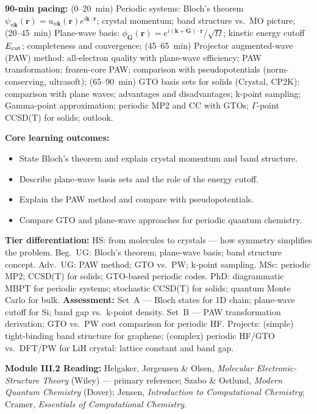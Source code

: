 \documentclass[11pt,a4paper]{article}
\begin{document}
\begin{tcolorbox}[chembox, title={Module~III.2 --- Lecture L16: Glimpse into the Solid State}]
\textbf{90-min pacing:} (0--20~min) Periodic systems: Bloch's theorem $\psi_{n\mathbf{k}}(\mathbf{r})=u_{n\mathbf{k}}(\mathbf{r})e^{i\mathbf{k}\cdot\mathbf{r}}$; crystal momentum; band structure vs.\ MO picture; (20--45~min) Plane-wave basis: $\phi_\mathbf{G}(\mathbf{r})=e^{i(\mathbf{k}+\mathbf{G})\cdot\mathbf{r}}/\sqrt{\Omega}$; kinetic energy cutoff $E_{\rm cut}$; completeness and convergence; (45--65~min) Projector augmented-wave (PAW) method: all-electron quality with plane-wave efficiency; PAW transformation; frozen-core PAW; comparison with pseudopotentials (norm-conserving, ultrasoft); (65--90~min) GTO basis sets for solids (Crystal, CP2K): comparison with plane waves; advantages and disadvantages; k-point sampling; Gamma-point approximation; periodic MP2 and CC with GTOs; $\Gamma$-point CCSD(T) for solids; outlook.

\medskip\textbf{Core learning outcomes:}
\begin{itemize}[leftmargin=1.4em,topsep=2pt,itemsep=1pt]
  \item State Bloch's theorem and explain crystal momentum and band structure.
  \item Describe plane-wave basis sets and the role of the energy cutoff.
  \item Explain the PAW method and compare with pseudopotentials.
  \item Compare GTO and plane-wave approaches for periodic quantum chemistry.
\end{itemize}
\medskip\textbf{Tier differentiation:}
HS: from molecules to crystals --- how symmetry simplifies the problem.
Beg.\ UG: Bloch's theorem; plane-wave basis; band structure concept.
Adv.\ UG: PAW method; GTO vs.\ PW; k-point sampling.
MSc: periodic MP2; CCSD(T) for solids; GTO-based periodic codes.
PhD: diagrammatic MBPT for periodic systems; stochastic CCSD(T) for solids; quantum Monte Carlo for bulk.
\medskip\textbf{Assessment:}
Set~A --- Bloch states for 1D chain; plane-wave cutoff for Si; band gap vs.\ k-point density.
Set~B --- PAW transformation derivation; GTO vs.\ PW cost comparison for periodic HF.
Projects: (simple) tight-binding band structure for graphene; (complex) periodic HF/GTO vs.\ DFT/PW for LiH crystal: lattice constant and band gap.
\end{tcolorbox}

\begin{tcolorbox}[highlightbox]
\textbf{Module III.2 Reading:} Helgaker, J\o rgensen \& Olsen, \textit{Molecular Electronic-Structure Theory} (Wiley) --- primary reference; Szabo \& Ostlund, \textit{Modern Quantum Chemistry} (Dover); Jensen, \textit{Introduction to Computational Chemistry}; Cramer, \textit{Essentials of Computational Chemistry}.
\end{tcolorbox}
\end{document}
